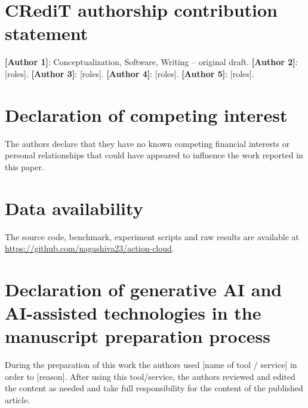 \documentclass[5p,times,twocolumn]{elsarticle}
\begin{document}
\section*{CRediT authorship contribution statement}
\textbf{[Author 1]}: Conceptualization, Software, Writing -- original draft. \textbf{[Author 2]}: [roles]. \textbf{[Author 3]}: [roles]. \textbf{[Author 4]}: [roles]. \textbf{[Author 5]}: [roles].

\section*{Declaration of competing interest}
The authors declare that they have no known competing financial interests or personal relationships that could have appeared to influence the work reported in this paper.

\section*{Data availability}
The source code, benchmark, experiment scripts and raw results are available at \url{https://github.com/nagashiva23/action-cloud}.

\section*{Declaration of generative AI and AI-assisted technologies in the manuscript preparation process}
During the preparation of this work the authors used [name of tool / service] in order to [reason]. After using this tool/service, the authors reviewed and edited the content as needed and take full responsibility for the content of the published article.



\end{document}
